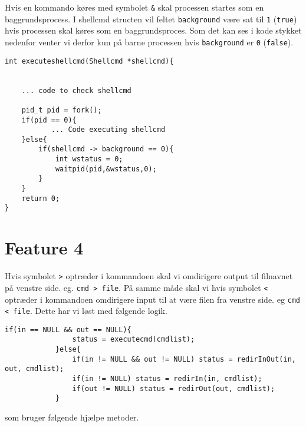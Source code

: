 \documentclass[danish]{report}
\begin{document}
Hvis en kommando køres med symbolet {\tt \&} skal processen startes som en baggrundsprocess. I shellcmd structen vil feltet {\tt background} være sat til {\tt 1} ({\tt true}) hvis processen skal køres som en baggrundsproces. Som det kan ses i kode stykket nedenfor venter vi derfor kun på barne processen hvis {\tt background} er {\tt 0} ({\tt false}).
\begin{lstlisting}
int executeshellcmd(Shellcmd *shellcmd){
    

    ... code to check shellcmd

    pid_t pid = fork();
    if(pid == 0){
           ... Code executing shellcmd
    }else{
        if(shellcmd -> background == 0){
            int wstatus = 0;    
            waitpid(pid,&wstatus,0);
        }
    }
    return 0;
}
\end{lstlisting}

\section{Feature 4}

Hvis symbolet {\tt >} optræder i kommandoen skal vi omdirigere output til filnavnet på venstre side. eg. {\tt cmd > file}. På samme måde skal vi hvis symbolet {\tt <} optræder i kommandoen omdirigere input til at være filen fra venstre side. eg {\tt cmd < file}. Dette har vi løst med følgende logik.

\begin{lstlisting}
if(in == NULL && out == NULL){
                status = executecmd(cmdlist);
            }else{
                if(in != NULL && out != NULL) status = redirInOut(in, out, cmdlist);
                if(in != NULL) status = redirIn(in, cmdlist);
                if(out != NULL) status = redirOut(out, cmdlist);
            }
\end{lstlisting}

som bruger følgende hjælpe metoder.
\end{document}
